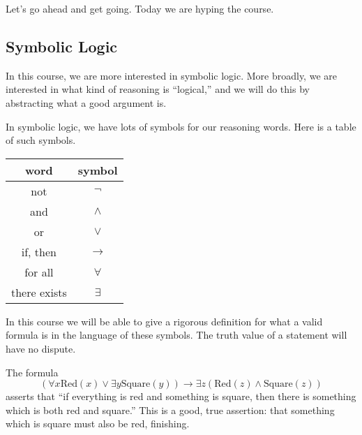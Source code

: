 \documentclass[../notes.tex]{subfiles}
\begin{document}






Let's go ahead and get going. Today we are hyping the course. 

\subsection{Symbolic Logic}
In this course, we are more interested in symbolic logic. More broadly, we are interested in what kind of reasoning is ``logical,'' and we will do this by abstracting what a good argument is.

In symbolic logic, we have lots of symbols for our reasoning words. Here is a table of such symbols.
\begin{center}
	\begin{tabular}{c|c}
		word & symbol \\\hline
		not & $\lnot$ \\
		and & $\land$ \\
		or & $\lor$ \\
		if, then & $\to$ \\
		for all & $\forall$ \\
		there exists & $\exists$
	\end{tabular}
\end{center}
In this course we will be able to give a rigorous definition for what a valid formula is in the language of these symbols. The truth value of a statement will have no dispute.
\begin{example}
	The formula
	\[(\forall x\text{Red}(x)\lor\exists y\text{Square}(y))\to\exists z(\text{Red}(z)\land\text{Square}(z))\]
	asserts that ``if everything is red and something is square, then there is something which is both red and square.'' This is a good, true assertion: that something which is square must also be red, finishing.
\end{example}
\end{document}
